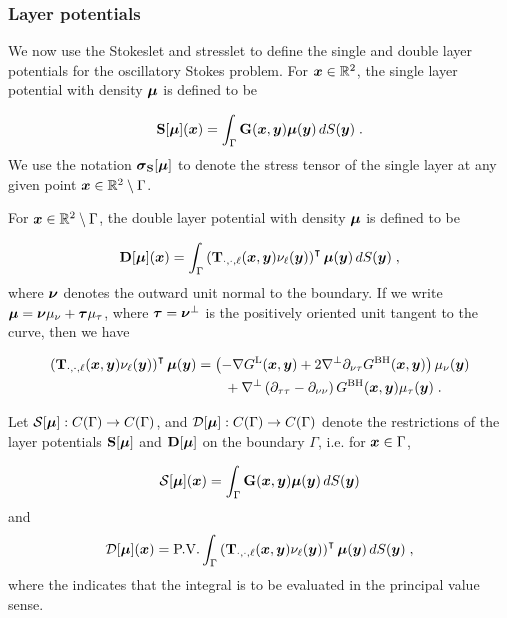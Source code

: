 \subsubsection{Layer potentials}

We now use the Stokeslet and stresslet 
to define the single
and double layer potentials for the oscillatory Stokes problem.
For ${\boldsymbol x} \in \mathbb{R}^2$, the single layer potential with density ${\boldsymbol \mu}$
is defined to be

\begin{equation} \label{eq:singlelayer}
  {\bf S} [{\boldsymbol \mu}] ({\boldsymbol x}) = \int_\Gamma {\bf G} ({\boldsymbol x},{\boldsymbol y}) {\boldsymbol \mu}({\boldsymbol y})
  \, dS({\boldsymbol y}) \; .
\end{equation}
We use the notation ${\boldsymbol \sigma}_{\bf S}[{\boldsymbol \mu}]$ to denote the
stress tensor of the single layer at any given point
${\boldsymbol x} \in \mathbb{R}^2 \setminus \Gamma$.

For ${\boldsymbol x} \in \mathbb{R}^2 \setminus \Gamma$, the double layer
potential with density ${\boldsymbol \mu}$ is defined to be

\begin{equation} \label{eq:doublelayer}
  {\bf D} [{\boldsymbol \mu}] ({\boldsymbol x}) = \int_\Gamma \left ( {\bf T}_{\cdot,\cdot,\ell}({\boldsymbol x},{\boldsymbol y})
  \nu_\ell({\boldsymbol y})\right )^\intercal {\boldsymbol \mu}({\boldsymbol y}) \, dS({\boldsymbol y}) \; ,
\end{equation}
where ${\boldsymbol \nu}$ denotes the outward unit normal to the boundary.
If we write ${\boldsymbol \mu} = {\boldsymbol \nu} \mu_\nu + {\boldsymbol \tau} \mu_\tau$,
where ${\boldsymbol \tau} = {\boldsymbol \nu}^\bot$ is the positively oriented unit
tangent to the curve, then we have

\begin{align} \label{eq:stokesdlkernel}
  \left ( {\bf T}_{\cdot,\cdot,\ell}({\boldsymbol x},{\boldsymbol y})\nu_\ell({\boldsymbol y}) \right )^\intercal
  {\boldsymbol \mu}({\boldsymbol y}) &= \left ( - \nabla G^{\textrm{L}}({\boldsymbol x},{\boldsymbol y}) + 2 \nabla^\bot
  \partial_{\nu\tau} G^{\textrm{BH}}({\boldsymbol x},{\boldsymbol y}) \right ) \mu_\nu({\boldsymbol y}) \nonumber \\
  & \qquad+
  \nabla^\bot \left (\partial_{\tau\tau}-\partial_{\nu\nu} \right )
  G^{\textrm{BH}}({\boldsymbol x},{\boldsymbol y}) \mu_\tau({\boldsymbol y}) \; .
\end{align}

Let ${\mathcal S}[{\boldsymbol \mu}]: C(\Gamma) \to C(\Gamma)$, and
${\mathcal D}[{\boldsymbol \mu}]: C(\Gamma) \to C(\Gamma)$ 
denote the restrictions of the layer potentials 
${\bf S}[{\boldsymbol \mu}]$ and ${\bf D}[{\boldsymbol \mu}]$ on the boundary $\Gamma$, i.e.
for ${\boldsymbol x} \in \Gamma$, 

\begin{equation}
  {\mathcal S} [{\boldsymbol \mu}] ({\boldsymbol x}) = \int_\Gamma {\bf G} ({\boldsymbol x},{\boldsymbol y}) {\boldsymbol \mu}({\boldsymbol y})
  \, dS({\boldsymbol y})
\end{equation}
and
\begin{equation}
\label{eq:dlformula}
  {\mathcal D} [{\boldsymbol \mu}] ({\boldsymbol x}) = \textrm{P.V.} \int_\Gamma \left ( {\bf T}_{\cdot,\cdot,\ell}({\boldsymbol x},{\boldsymbol y})
  \nu_\ell({\boldsymbol y})
  \right )^\intercal {\boldsymbol \mu}({\boldsymbol y}) \, dS({\boldsymbol y}) \; ,
\end{equation}
where the \pv indicates that the integral is to be
evaluated in the principal value sense. 

